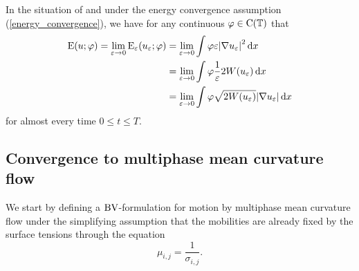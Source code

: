\begin{lemma}
	\label{equipartition_of_energies_multiphase}
	In the situation of  and under the energy convergence assumption (\ref{energy_convergence}), we have for any continuous $ \varphi \in \operatorname{C} ( \operatorname{\mathbb{T}} ) $ that
	\begin{align*}
		\operatorname{E} ( u ; \varphi )
		=
		\lim_{ \varepsilon \to 0 }
			\operatorname{E}_{ \varepsilon } ( u_{ \varepsilon } ; \varphi )
		& =
		\lim_{ \varepsilon \to 0 }
			\int
				\varphi
				\varepsilon
				\abs{ \nabla u_{ \varepsilon } }^{ 2 }
			\dd{ x }
		\\
		& =
		\lim_{ \varepsilon \to 0 }
			\int
				\varphi
				\frac{ 1 }{ \varepsilon } 2 W ( u_{ \varepsilon } )
			\dd{ x }
		\\
		& =
		\lim_{ \varepsilon \to 0 }
			\int
				\varphi
				\sqrt{ 2 W ( u_{ \varepsilon } ) }
				\abs{ \nabla u_{ \varepsilon } }
			\dd{ x }
	\end{align*}
	for almost every time $ 0 \leq t \leq T $.
\end{lemma}

\subsection{Convergence to multiphase mean curvature flow}

We start by defining a $ \operatorname{BV} $-formulation for motion by multiphase mean curvature flow under the simplifying assumption that the mobilities are already fixed by the surface tensions through the equation
\begin{equation}
	\label{mobilites_inverse_of_surface_tensions}
	\mu_{ i , j } =\frac{ 1 }{ \sigma_{ i , j } }. 
\end{equation}

